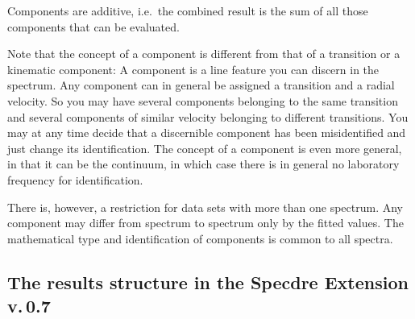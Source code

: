 \begin{itemize}
   Components are additive, i.e.\ the combined result is the sum of all
   those components that can be evaluated.

   Note that the concept of a component is different from that of a
   transition or a kinematic component: A component is a line feature
   you can discern in the spectrum. Any component can in general be
   assigned a transition and a radial velocity. So you may have several
   components belonging to the same transition and several components of
   similar velocity belonging to different transitions. You may at any
   time decide that a discernible component has been misidentified and
   just change its identification. The concept of a component is even
   more general, in that it can be the continuum, in which case there is
   in general no laboratory frequency for identification.

   There is, however, a restriction for data sets with more than one
   spectrum. Any component may differ from spectrum to spectrum only by
   the fitted values. The mathematical type and identification of
   components is common to all spectra.

\end{itemize}


\subsection{The results structure in the Specdre Extension v.\,0.7}

